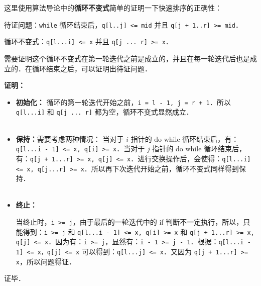 这里使用算法导论中的\textbf{循环不变式}简单的证明一下快速排序的正确性：

待证问题：\verb|while| 循环结束后，\verb|q[l..j] <= mid| 并且 \verb|q[j + 1..r] >= mid|．

循环不变式：\verb|q[l...i] <= x| 并且 \verb|q[j ... r] >= x|．

需要证明这个循环不变式在第一轮迭代之前是成立的，并且在每一轮迭代后也是成立的．在循环结束之后，可以证明出待证问题．

\textbf{证明：}
\begin{itemize}
\item 

\textbf{初始化：} 循环的第一轮迭代开始之前，\verb|i = l - 1, j = r + 1|．所以 \verb|q[l...i]| 和 \verb|q[j ... r]| 都为空，循环不变式显然成立．\\\\

\item \textbf{保持：}需要考虑两种情况：
当对于 $i$ 指针的 $\text{do while}$ 循环结束后，有：\verb|q[l...i - 1] <= x, q[i] >= x|．当对于 $j$ 指针的 $\text{do while}$ 循环结束后，有：\verb|q[j + 1...r] >= x, q[j] <= x|．进行交换操作后，会使得：\verb|q[l...i] <= x, q[j...r] >= x|．所以再下次迭代开始之前，循环不变式同样得到保持．\\\\

\item \textbf{终止：}

当终止时，\verb|i >= j|，由于最后的一轮迭代中的 if 判断不一定执行，所以，只能得到：\verb|i >= j| 和 \verb|q[l...i - 1] <= x, q[i] >= x| 和 \verb|q[j + 1...r] >= x, q[j] <= x|．因为有：\verb|i >= j|，显然有：\verb|i - 1 >= j - 1|．根据：\verb|q[l...i - 1] <= x，q[j] <= x| 可以得到：\verb|q[l...j] <= x|．又因为 \verb|q[j + 1...r] >= x|，所以问题得证．

\end{itemize}

证毕．